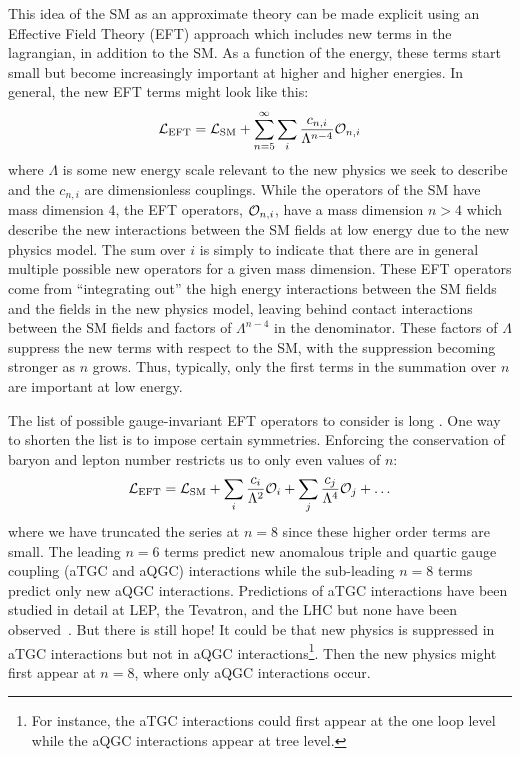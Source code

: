 This idea of the SM as an approximate theory
can be made explicit 
using an Effective Field Theory (EFT) \cite{Pich:1998xt}
approach which includes new terms in the lagrangian, in addition to the SM.
As a function of the energy, these terms start small 
but become increasingly important at higher and higher energies.
In general, the new EFT terms might look like this:
\begin{equation}
\mathcal{L}_{\textrm{EFT}} = \mathcal{L}_{\textrm{SM}} + \sum_{n=5}^{\infty} \sum_i \frac{c_{n,i}}{\Lambda^{n-4}} \mathcal{O}_{n,i}
\label{eq:lagrangian_eft_gen}
\end{equation}
where $\Lambda$ is some new energy scale relevant to the new
physics we seek to describe and the $c_{n,i}$ are dimensionless
couplings.  While the operators of the SM have mass dimension 4, the EFT 
operators, $\mathcal{O}_{n,i}$, have a mass dimension
$n>4$ which describe the new interactions between the SM fields at low energy
due to the new physics model.
The sum over $i$ is simply to indicate that there are in general multiple 
possible new operators for a given mass dimension.
These EFT operators come from ``integrating out'' the high energy interactions
between the SM fields and the fields in the new physics model,
leaving behind contact interactions between the SM fields and factors
of $\Lambda^{n-4}$ in the denominator.
These factors of $\Lambda$ suppress the new terms
with respect to the SM, with the suppression becoming stronger as $n$ grows.
Thus, typically, only the first terms in the summation
over $n$ are important at low energy.

The list of possible gauge-invariant EFT operators to 
consider is long \cite{Hagiwara:1993ck,Buchmuller:1985jz,Eboli:2006wa}.
One way to shorten the list is to impose certain symmetries. 
Enforcing the conservation
of baryon and lepton number restricts 
us to only even values of $n$:
\begin{equation}
\curlyl_{\textrm{EFT}} = \curlyl_{\textrm{SM}} + \sum_i \frac{c_{i}}{\Lambda^2} \curlyo_{i} + \sum_j \frac{c_{j}}{\Lambda^4} \curlyo_{j} + \dots
\label{eq:lagrangian_eft}
\end{equation}
where we have truncated the series at $n=8$ since 
these higher order terms are small.
The leading $n=6$ terms predict new anomalous triple and quartic 
gauge coupling (aTGC and aQGC) interactions while the sub-leading $n=8$ terms
predict only new aQGC interactions. 
Predictions of aTGC interactions have been studied in detail at 
LEP, the Tevatron, and the LHC  but none have been observed~\cite{PDG:2014}.
But there is still hope!
It could be that new physics is suppressed in aTGC interactions
but not in aQGC interactions\footnote{For instance, the aTGC interactions
could first appear at the one loop level while the aQGC 
interactions appear at tree level.}.
Then the new physics might first appear at $n=8$, where only aQGC interactions
occur.



